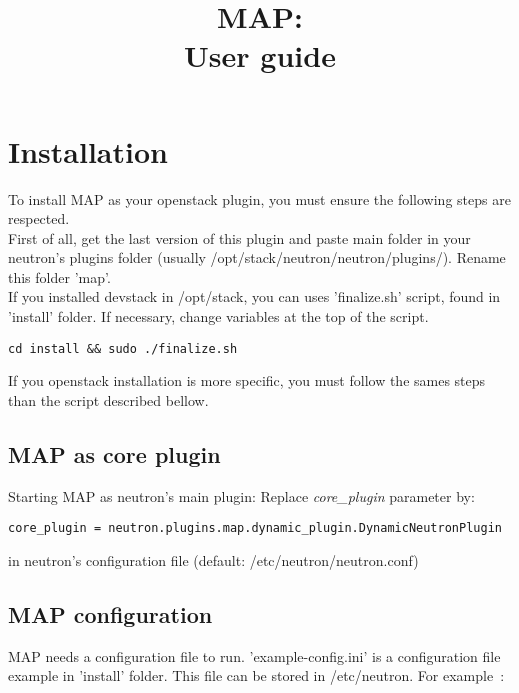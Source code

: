 



\title{MAP:\\User guide}
\maketitle
\section{Installation}

To install MAP as your openstack plugin, you must ensure the following steps
are respected.\\
First of all, get the last version of this plugin and paste main folder in
your neutron's plugins folder (usually /opt/stack/neutron/neutron/plugins/).
Rename this folder 'map'.\\

If you installed devstack in /opt/stack, you can uses 'finalize.sh' script, found in 'install' folder.
If necessary, change variables at the top of the script.
\begin{verbatim}
cd install && sudo ./finalize.sh
\end{verbatim}

If you openstack installation is more specific, you must follow the sames steps
than the script described bellow.

\subsection{MAP as core plugin}
Starting MAP as neutron's main plugin:
Replace \textit{core\_plugin} parameter by:
\begin{verbatim}
core_plugin = neutron.plugins.map.dynamic_plugin.DynamicNeutronPlugin
\end{verbatim}
in neutron's configuration file (default: /etc/neutron/neutron.conf)

\subsection{MAP configuration}
MAP needs a configuration file to run. 'example-config.ini' is a configuration
file example in 'install' folder. This file can be stored in /etc/neutron. For
example~:

